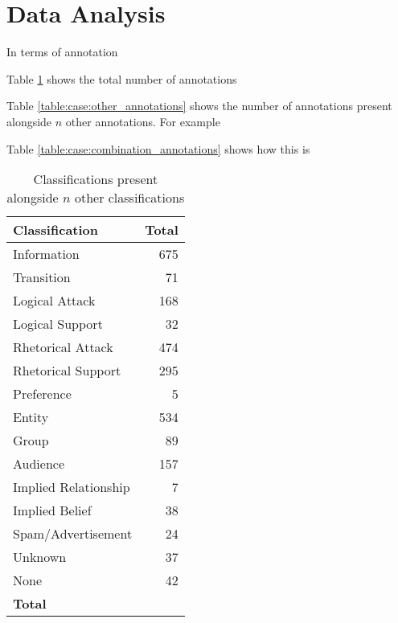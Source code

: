 
\section{Data Analysis}

In terms of annotation

Table \ref{table:case:annotations} shows the total number of annotations 

Table \ref{table:case:other_annotations} shows the number of annotations present alongside $n$ other annotations. For example

Table \ref{table:case:combination_annotations} shows how this is 

\begin{table}
\centering
\caption{Classifications present alongside $n$ other classifications}
\label{table:case:annotations}
\begin{tabular}{ l | r }
\textbf{Classification} & \textbf{Total}  \\
\hline
Information & 675 \\
Transition & 71 \\
Logical Attack & 168 \\
Logical Support & 32 \\
Rhetorical Attack &  474\\
Rhetorical Support & 295 \\
Preference & 5 \\
Entity & 534 \\
Group & 89 \\
Audience & 157 \\
Implied Relationship & 7 \\
Implied Belief & 38 \\
Spam/Advertisement & 24 \\
Unknown & 37 \\
None & 42 \\
\textbf{Total} & \\
\end{tabular}
\end{table}


